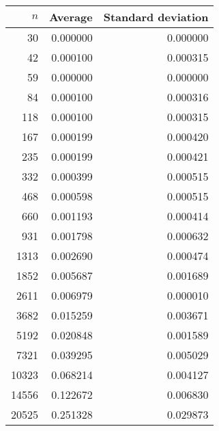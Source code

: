 \begin {tabular}{rrr}
$n$ & Average & Standard deviation\\ \hline 
30 & 0.000000 & 0.000000\\ 
42 & 0.000100 & 0.000315\\ 
59 & 0.000000 & 0.000000\\ 
84 & 0.000100 & 0.000316\\ 
118 & 0.000100 & 0.000315\\ 
167 & 0.000199 & 0.000420\\ 
235 & 0.000199 & 0.000421\\ 
332 & 0.000399 & 0.000515\\ 
468 & 0.000598 & 0.000515\\ 
660 & 0.001193 & 0.000414\\ 
931 & 0.001798 & 0.000632\\ 
1313 & 0.002690 & 0.000474\\ 
1852 & 0.005687 & 0.001689\\ 
2611 & 0.006979 & 0.000010\\ 
3682 & 0.015259 & 0.003671\\ 
5192 & 0.020848 & 0.001589\\ 
7321 & 0.039295 & 0.005029\\ 
10323 & 0.068214 & 0.004127\\ 
14556 & 0.122672 & 0.006830\\ 
20525 & 0.251328 & 0.029873\\ 
\end{tabular}
